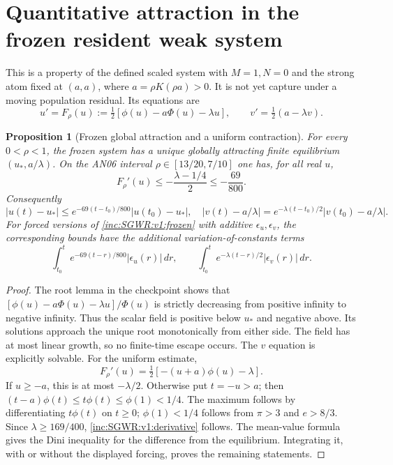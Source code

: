 \documentclass[11pt]{article}
\numberwithin{equation}{section}
\newtheorem{proposition}[theorem]{Proposition}
\theoremstyle{remark}\newtheorem{remark}[theorem]{Remark}
\newcommand{\dd}{\,d}
\newcommand{\1}{\mathbf1}
\begin{document}
\section{Quantitative attraction in the frozen resident weak system}
This is a property of the defined scaled system with $M=1,N=0$ and the
strong atom fixed at $(a,a)$, where $a=\rho K(\rho a)>0$. It is not yet
capture under a moving population residual. Its equations are
\begin{equation}\label{inc:SGWR:v1:frozen}
 u'=F_\rho(u):=\tfrac12[\phi(u)-a\Phi(u)-\lambda u],
 \qquad v'=\tfrac12(a-\lambda v).
\end{equation}

\begin{proposition}[Frozen global attraction and a uniform contraction]
\label{inc:SGWR:v1:contraction}
For every $0<\rho<1$, the frozen system has a unique globally attracting
finite equilibrium $(u_*,a/\lambda)$. On the AN06 interval
$\rho\in[13/20,7/10]$ one has, for all real $u$,
\begin{equation}\label{inc:SGWR:v1:derivative}
 F_\rho'(u)\le-\frac{\lambda-1/4}{2}
 \le-\frac{69}{800}.
\end{equation}
Consequently
\[
 |u(t)-u_*|\le e^{-69(t-t_0)/800}|u(t_0)-u_*|,
 \quad
 |v(t)-a/\lambda|=e^{-\lambda(t-t_0)/2}|v(t_0)-a/\lambda|.
\]
For forced versions of \eqref{inc:SGWR:v1:frozen} with additive
$\epsilon_u,\epsilon_v$, the corresponding bounds have the additional
variation-of-constants terms
\[
 \int_{t_0}^t e^{-69(t-r)/800}|\epsilon_u(r)|\dd r,
 \qquad
 \int_{t_0}^t e^{-\lambda(t-r)/2}|\epsilon_v(r)|\dd r.
\]
\end{proposition}
\begin{proof}
The root lemma in the checkpoint shows that
$[\phi(u)-a\Phi(u)-\lambda u]/\Phi(u)$ is strictly decreasing from
positive infinity to negative infinity. Thus the scalar field is positive
below $u_*$ and negative above. Its solutions approach the unique root
monotonically from either side. The field has at most linear growth,
so no finite-time escape occurs. The $v$ equation is explicitly solvable.
For the uniform estimate,
\[
 F_\rho'(u)=\tfrac12[-(u+a)\phi(u)-\lambda].
\]
If $u\ge-a$, this is at most $-\lambda/2$. Otherwise put $t=-u>a$;
then $(t-a)\phi(t)\le t\phi(t)\le\phi(1)<1/4$.
The maximum follows by differentiating $t\phi(t)$ on $t\ge0$;
$\phi(1)<1/4$ follows from $\pi>3$ and $e>8/3$.
Since $\lambda\ge169/400$, \eqref{inc:SGWR:v1:derivative} follows.
The mean-value formula gives the Dini inequality for the difference from
the equilibrium. Integrating it, with or without the displayed forcing,
proves the remaining statements.
\end{proof}
\end{document}
